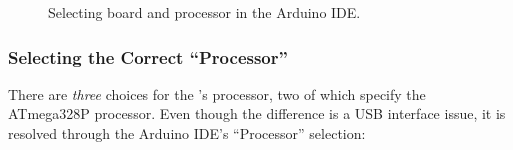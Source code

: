 \begin{figure}
    \centering
    \hfil

    \caption{Selecting board and processor in the Arduino IDE.
        \label{fig:selecting-nano}}
\end{figure}

\subsubsection{Selecting the Correct ``Processor''}\label{sec:processor-selection}

There are \textit{three} choices for the \nano{}'s processor, two of which
specify the ATmega328P processor. Even though the difference is a USB
interface issue, it is resolved through the Arduino IDE's ``Processor''
selection:

